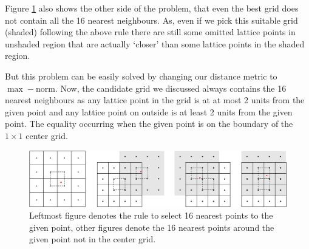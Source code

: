 \documentclass[a4paper, landscape]{article}
\begin{document}
Figure \ref{fig:nearest} also shows the other side of the problem, that even the best grid does not contain all the 16 nearest neighbours. As, even if we pick this suitable grid (shaded) following the above rule there are still some omitted lattice points in unshaded region that are actually `closer' than some lattice points in the shaded region.

But this problem can be easily solved by changing our distance metric to $\max-$norm. Now, the candidate grid we discussed always contains the 16 nearest neighbours as any lattice point in the grid is at at most 2 units from the given point and any lattice point on outside is at least 2 units from the given point. The equality occurring when the given point is on the boundary of the $1\times1$ center grid.
\begin{figure}[H]
    \centering
    \includegraphics[width=\linewidth]{nearest_point.pdf}
    \caption{Leftmost figure denotes the rule to select 16 nearest points to the given point, other figures denote the 16 nearest points around the given point not in the center grid.}
    \label{fig:nearest}
\end{figure}
\end{document}
